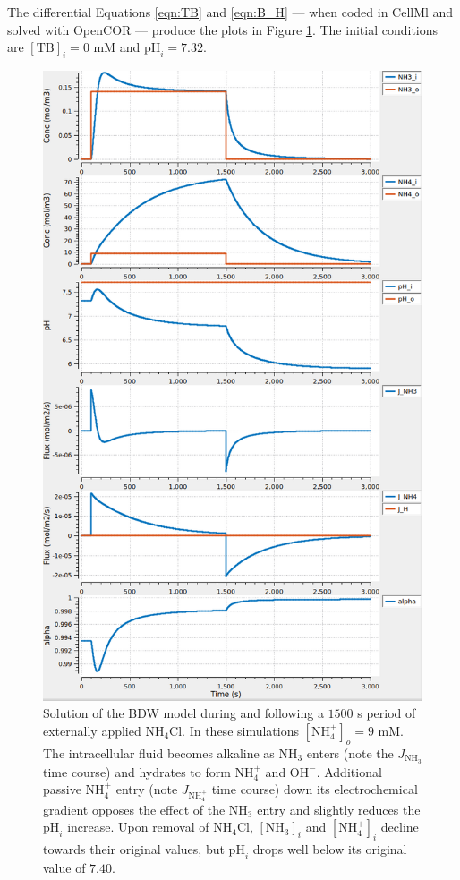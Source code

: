 \documentclass[fleqn,10pt]{physiome}
\begin{document}
The differential Equations \ref{eqn:TB} and \ref{eqn:B_H} --- when coded in CellMl and solved with OpenCOR --- produce the plots in Figure \ref{fig:6}. The initial conditions are $[\mathrm{TB}]_i = 0$ mM and $\mathrm{pH}_i=7.32$.

\begin{figure}
\centering
\includegraphics[scale=0.4]{Figure 6.png}
\caption{\label{fig:6} Solution of the BDW model during and following a $1500$ s period of externally applied $\mathrm{NH_4Cl}$. In these simulations $\mathrm{[NH_4^+]}_o=9$ mM. The intracellular fluid becomes alkaline as $\mathrm{NH_3}$ enters (note the $J_\mathrm{NH_3}$ time course) and hydrates to form $\mathrm{NH_4^+}$ and $\mathrm{OH^-}$. Additional passive $\mathrm{NH_4^+}$ entry (note $J_\mathrm{NH_4^+}$ time course) down its electrochemical gradient opposes the effect of the $\mathrm{NH_3}$ entry and slightly reduces the $\mathrm{pH}_i$ increase. Upon removal of $\mathrm{NH_4Cl}$, $\mathrm{[NH_3]}_i$ and $\mathrm{[NH_4^+]}_i$ decline towards their original values, but $\mathrm{pH}_i$ drops well below its original value of $7.40$.}
\end{figure}
\end{document}
